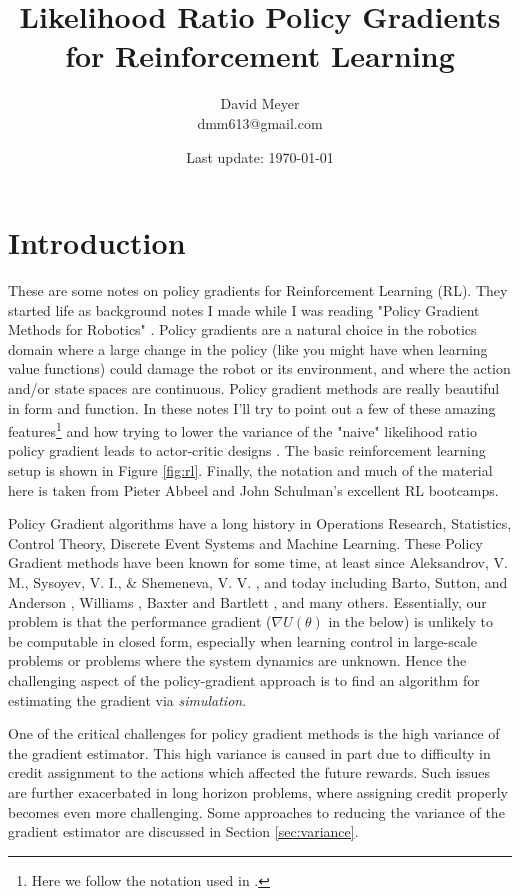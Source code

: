 \documentclass[11pt, oneside]{article}					%
\title{Likelihood Ratio Policy Gradients for Reinforcement Learning}
\author{David Meyer \\ dmm613@gmail.com}
\date{Last update: \today}					%
\begin{document}
\maketitle

\section{Introduction} 
\label{sec:intro}
These are some notes on policy gradients for Reinforcement
Learning (RL). They started life as background notes I made while
I was reading "Policy Gradient Methods for Robotics"
\cite{Peters:2006fk}.  Policy gradients are a natural choice in
the robotics domain where a large change in the policy (like you
might have when learning value functions) could damage the robot
or its environment, and where the action and/or state spaces are
continuous. Policy gradient methods are really beautiful in form
and function. In these notes I'll try to point out a few of these
amazing features\footnote{Here we follow the notation used in
\cite{SuttonBook}.} and how trying to lower the variance of the
"naive" likelihood ratio policy gradient leads to actor-critic
designs \cite{NIPS1999_1786}. The basic reinforcement learning
setup is shown in Figure \ref{fig:rl}.  Finally, the notation and
much of the material here is taken from Pieter Abbeel and John
Schulman's excellent RL bootcamps.



\bigskip
\noindent
Policy Gradient algorithms have a long history in Operations
Research, Statistics, Control Theory, Discrete Event Systems and
Machine Learning. These Policy Gradient methods have been known
for some time, at least since Aleksandrov, V. M., Sysoyev, V. I.,
\& Shemeneva, V. V. \cite{oALE68a}, and today including Barto,
Sutton, and Anderson \cite{Barto1983NeuronlikeAE}, Williams
\cite{Williams1992}, Baxter and Bartlett
\cite{Baxter:2001:IPE:1622845.1622855}, and many
others. Essentially, our problem is that the performance gradient
($\nabla U(\theta)$ in the below) is unlikely to be computable in
closed form, especially when learning control in large-scale
problems or problems where the system dynamics are unknown. Hence
the challenging aspect of the policy-gradient approach is to find
an algorithm for estimating the gradient via \emph{simulation}.

\bigskip
\noindent
One of the critical challenges for policy gradient methods is the
high variance of the gradient estimator. This high variance is
caused in part due to difficulty in credit assignment to the
actions which affected the future rewards. Such issues are
further exacerbated in long horizon problems, where assigning
credit properly becomes even more challenging. Some approaches to
reducing the variance of the gradient estimator are discussed in
Section \ref{sec:variance}.
\end{document}
